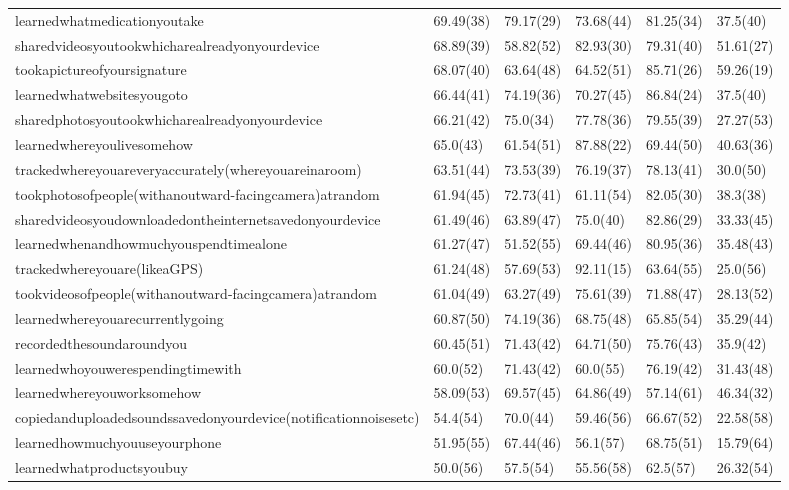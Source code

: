 \documentclass[a4paper,12pt]{article}
\begin{document}
\begin{longtable}{| p{7cm} | l | l | l | l | l |}
learnedwhatmedicationyoutake & 69.49(38) & 79.17(29) & 73.68(44) & 81.25(34) & 37.5(40) \\ 
sharedvideosyoutookwhicharealreadyonyourdevice & 68.89(39) & 58.82(52) & 82.93(30) & 79.31(40) & 51.61(27) \\ 
tookapictureofyoursignature & 68.07(40) & 63.64(48) & 64.52(51) & 85.71(26) & 59.26(19) \\ 
learnedwhatwebsitesyougoto & 66.44(41) & 74.19(36) & 70.27(45) & 86.84(24) & 37.5(40) \\ 
sharedphotosyoutookwhicharealreadyonyourdevice & 66.21(42) & 75.0(34) & 77.78(36) & 79.55(39) & 27.27(53) \\ 
learnedwhereyoulivesomehow & 65.0(43) & 61.54(51) & 87.88(22) & 69.44(50) & 40.63(36) \\ 
trackedwhereyouareveryaccurately(whereyouareinaroom) & 63.51(44) & 73.53(39) & 76.19(37) & 78.13(41) & 30.0(50) \\ 
tookphotosofpeople(withanoutward-facingcamera)atrandom & 61.94(45) & 72.73(41) & 61.11(54) & 82.05(30) & 38.3(38) \\ 
sharedvideosyoudownloadedontheinternetsavedonyourdevice & 61.49(46) & 63.89(47) & 75.0(40) & 82.86(29) & 33.33(45) \\ 
learnedwhenandhowmuchyouspendtimealone & 61.27(47) & 51.52(55) & 69.44(46) & 80.95(36) & 35.48(43) \\ 
trackedwhereyouare(likeaGPS) & 61.24(48) & 57.69(53) & 92.11(15) & 63.64(55) & 25.0(56) \\ 
tookvideosofpeople(withanoutward-facingcamera)atrandom & 61.04(49) & 63.27(49) & 75.61(39) & 71.88(47) & 28.13(52) \\ 
learnedwhereyouarecurrentlygoing & 60.87(50) & 74.19(36) & 68.75(48) & 65.85(54) & 35.29(44) \\ 
recordedthesoundaroundyou & 60.45(51) & 71.43(42) & 64.71(50) & 75.76(43) & 35.9(42) \\ 
learnedwhoyouwerespendingtimewith & 60.0(52) & 71.43(42) & 60.0(55) & 76.19(42) & 31.43(48) \\ 
learnedwhereyouworksomehow & 58.09(53) & 69.57(45) & 64.86(49) & 57.14(61) & 46.34(32) \\ 
copiedanduploadedsoundssavedonyourdevice(notificationnoisesetc) & 54.4(54) & 70.0(44) & 59.46(56) & 66.67(52) & 22.58(58) \\ 
learnedhowmuchyouuseyourphone & 51.95(55) & 67.44(46) & 56.1(57) & 68.75(51) & 15.79(64) \\ 
learnedwhatproductsyoubuy & 50.0(56) & 57.5(54) & 55.56(58) & 62.5(57) & 26.32(54) \\ 

\end{longtable}
\end{document}
